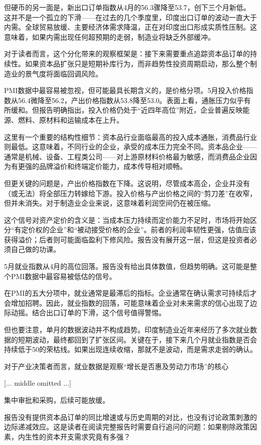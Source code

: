 \documentclass[11pt]{ctexart}
\begin{document}
但硬币的另一面是，新出口订单指数从4月的56.3骤降至53.7，创下三个月新低。这并不是一个孤立的下滑——在过去的几个季度里，印度出口订单的波动一直大于内需。全球贸易放缓、主要经济体需求降温，正在对印度出口形成实质性压制。这意味着，如果内需出现任何超预期的走弱，制造业将缺乏外部缓冲。

对于读者而言，这个分化带来的观察框架是：接下来需要重点追踪资本品订单的持续性。如果资本品扩张只是短期补库行为，而非趋势性投资周期启动，那么整个制造业的景气度将面临回调风险。

PMI数据中最容易被忽视，但可能最具长期含义的，是价格分项。5月投入价格指数从56.4微降至56.2，产出价格指数从53.8降至53.0。表面上看，通胀压力似乎有所缓和。但报告明确指出，投入价格仍处于“近四年高位”附近，企业普遍反映能源、燃料、原材料和运输成本在上升。

这里有一个重要的结构性细节：资本品行业面临最高的投入成本通胀，消费品行业则最低。这意味着，不同行业的企业，承受的成本压力完全不同。资本品企业——通常是机械、设备、工程类公司——对上游原材料价格最为敏感，而消费品企业因为有更强的品牌溢价和终端定价能力，成本传导相对顺畅。

但更关键的问题是，产出价格指数在下降。这说明，尽管成本高企，企业并没有（或无法）将全部压力转嫁给下游。投入价格与产出价格之间的“剪刀差”在收窄，但并未消失。对于制造业企业来说，这意味着利润空间仍在被压缩。

这个信号对资产定价的含义是：当成本压力持续而定价能力不足时，市场将开始区分“有定价权的企业”和“被动接受价格的企业”。前者的利润率韧性更强，估值应该获得溢价；后者则可能面临盈利下修风险。报告没有展开这一层，但这是投资者必须自己做的功课。

5月就业指数从4月的高位回落。报告没有给出具体数值，但趋势明确。这可能是整个PMI数据中最容易被低估的信号。

在PMI的五大分项中，就业通常是最滞后的指标。企业通常在确认需求可持续后才会增加招聘。因此，就业指数的回落，可能意味着企业对未来需求的信心出现了边际动摇。结合出口订单的下滑，这个信号值得警惕。

但也要注意，单月的数据波动并不构成趋势。印度制造业近年来经历了多次就业数据的短期波动，最终都回到了扩张区间。关键在于，接下来几个月就业指数是否会持续低于50的荣枯线。如果出现连续收缩，那就不是波动，而是需求走弱的确认。

对于产业决策者而言，就业数据是观察“增长是否惠及劳动力市场”的核心

[... middle omitted ...]

集中审批和采购，后续可能放缓。

报告没有提供资本品订单的同比增速或与历史周期的对比，也没有讨论政策刺激的边际递减效应。这是读者在阅读完整报告时需要自行追问的问题：如果剔除政策因素，内生性的资本开支需求究竟有多强？
\end{document}
